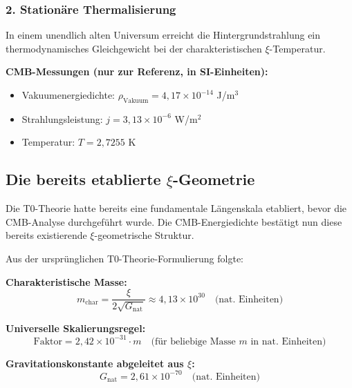 \documentclass[12pt,a4paper]{article}
\theoremstyle{definition}
\theoremstyle{remark}
\begin{document}
	\subsubsection{2. Station\"are Thermalisierung}
	In einem unendlich alten Universum erreicht die Hintergrundstrahlung ein thermodynamisches Gleichgewicht bei der charakteristischen $\xi$-Temperatur.
	
	\begin{sibox}
		\textbf{CMB-Messungen (nur zur Referenz, in SI-Einheiten):}
		\begin{itemize}
			\item Vakuumenergiedichte: $\rho_{\text{Vakuum}} = 4,17 \times 10^{-14}$ J/m$^3$
			\item Strahlungsleistung: $j = 3,13 \times 10^{-6}$ W/m$^2$
			\item Temperatur: $T = 2,7255$ K
		\end{itemize}
	\end{sibox}
	
	\subsection{Die bereits etablierte $\xi$-Geometrie}
	
	\begin{important}
		Die T0-Theorie hatte bereits eine fundamentale L\"angenskala etabliert, bevor die CMB-Analyse durchgef\"uhrt wurde. Die CMB-Energiedichte best\"atigt nun diese bereits existierende $\xi$-geometrische Struktur.
	\end{important}
	
	Aus der urspr\"unglichen T0-Theorie-Formulierung folgte:
	
	\textbf{Charakteristische Masse:}
	\begin{equation}
		m_{\text{char}} = \frac{\xi}{2\sqrt{G_{\text{nat}}}} \approx 4,13 \times 10^{30} \quad \text{(nat. Einheiten)}
	\end{equation}
	
	\textbf{Universelle Skalierungsregel:}
	\begin{equation}
		\text{Faktor} = 2,42 \times 10^{-31} \cdot m \quad \text{(f\"ur beliebige Masse } m \text{ in nat. Einheiten)}
	\end{equation}
	
	\textbf{Gravitationskonstante abgeleitet aus $\xi$:}
	\begin{equation}
		G_{\text{nat}} = 2,61 \times 10^{-70} \quad \text{(nat. Einheiten)}
	\end{equation}
	
\end{document}
